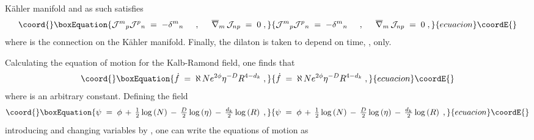 \documentclass[a4paper,11pt]{article}
\begin{document}
K\"ahler manifold and as such satisfies \cite{art:kaehler}
\begin{equation}\coord{}\boxEquation{
{\mathcal{J}^{m}}_{p}{\mathcal{J}^{p}}_{n} \;=\; -{\delta^{m}}_{n} 
   \hspace{.5cm},\hspace{.5cm}
\overline{\nabla}_{m}\, \mathcal{J}_{np}\;=\; 0 \; ,
\label{eq:KDef}
}{
{\mathcal{J}^{m}}_{p}{\mathcal{J}^{p}}_{n} \;=\; -{\delta^{m}}_{n} 
   \hspace{.5cm},\hspace{.5cm}
\overline{\nabla}_{m}\, \mathcal{J}_{np}\;=\; 0 \; ,
}{ecuacion}\coordE{}\end{equation}
where \myHighlight{$\overline{\nabla}$}\coordHE{} is the connection on the K\"ahler manifold.
Finally, the dilaton is taken to depend on time, \myHighlight{$\sigma $}\coordHE{}, only.
\par
Calculating the equation of motion for the Kalb-Ramond field, one finds
that
\begin{equation}\coord{}\boxEquation{
  \dot{f} \;=\; \aleph\, Ne^{2\phi}\eta^{-D}R^{4-d_{k}} \; ,
}{
  \dot{f} \;=\; \aleph\, Ne^{2\phi}\eta^{-D}R^{4-d_{k}} \; ,
}{ecuacion}\coordE{}\end{equation}
where \myHighlight{$\aleph$}\coordHE{} is an arbitrary constant.
Defining the field
\begin{equation}\coord{}\boxEquation{
\psi \;=\; \phi 
           \,+\, \textstyle{\frac{1}{2}}\log\left( N\right)
           \,-\, \textstyle{\frac{D}{2}}\log\left( \eta\right)
           \,-\, \textstyle{\frac{d_{k}}{2}}\log\left( R\right) \; ,
}{
\psi \;=\; \phi 
           \,+\, \textstyle{\frac{1}{2}}\log\left( N\right)
           \,-\, \textstyle{\frac{D}{2}}\log\left( \eta\right)
           \,-\, \textstyle{\frac{d_{k}}{2}}\log\left( R\right) \; ,
}{ecuacion}\coordE{}\end{equation}
introducing \coordHE{} and changing variables by \coordHE{},
one can write the equations of motion as
\end{document}
